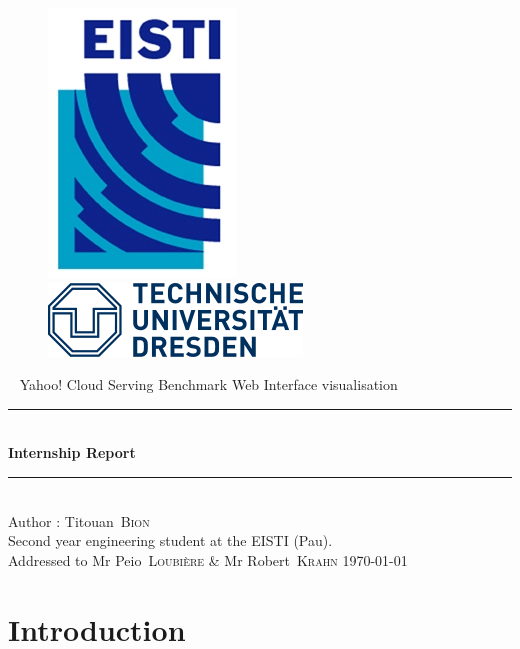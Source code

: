 \documentclass[a4paper,11pt]{article}
\newcommand*{\HRule}{\rule{\linewidth}{0.4mm}}  %
\newcommand*{\auteur}[2]{\large #1~\textsc{#2}} %
\newcommand{\pretitre}{Yahoo! Cloud Serving Benchmark Web Interface visualisation}
\newcommand{\grostitre}{Internship Report}
\newcommand{\auteurs}{Author : \auteur{Titouan}{Bion} \\ Second year engineering student at the EISTI (Pau).}
\newcommand{\correcteurs}{Addressed to Mr \auteur{Peio}{Loubière} \& Mr \auteur{Robert}{Krahn}}
\newcommand{\madate}{\today} %
\begin{document}


\begin{titlepage}
\begin{figure}[h]
\includegraphics[scale=1]{images/Logo_EISTI.png}
\hfill
\includegraphics[scale=0.6]{images/Logo_TUD.png}
\end{figure}
  \begin{center}
    ~
    \vfill
    {\Large\pretitre\\}           %
    \vspace{2cm}
    \HRule \\[0.4cm]
    {\Huge\bf\grostitre\\[0.4cm]} %
    \HRule \\[0.4cm]
    \vspace{2cm}
    \auteurs\\                    %
    \medskip
    \vfill
   	\correcteurs
    \vfill
    {\large\madate}               %
  \end{center}
\end{titlepage}



\tableofcontents

\newpage

\section{Introduction}
\end{document}
